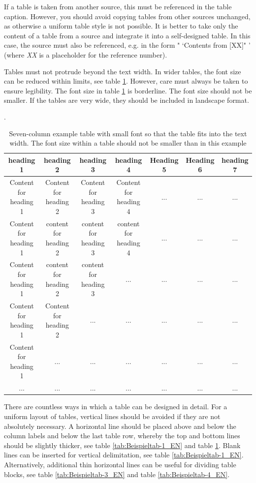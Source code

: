 If a table is taken from another source, this must be referenced in the table caption. However, you should avoid copying tables from other sources unchanged, as otherwise a uniform table style is not possible. It is better to take only the content of a table from a source and integrate it into a self-designed table. In this case, the source must also be referenced, e.g. in the form " `Contents from [XX]" ' (where \textit{XX} is a placeholder for the reference number).

Tables must not protrude beyond the text width. In wider tables, the font size can be reduced within limits, see table \ref{tab:Beispieltab-2_EN}. However, care must always be taken to ensure legibility. The font size in table \ref{tab:Beispieltab-2_EN} is borderline. The font size should not be smaller. If the tables are very wide, they should be included in landscape format.

\begin{table}[t]%
	\tiny
	\centering
	\caption[Seven-column example table with small font]{Seven-column example table with small font so that the table fits into the text width. The font size within a table should not be smaller than in this example}.
	\begin{tabular}{ccccccc}
		\toprule
		\textbf{heading 1} & \textbf{heading 2} & \textbf{heading 3} & \textbf{heading 4} & \textbf{Heading 5} & \textbf{Heading 6} & \textbf{heading 7} \\
		\midrule
		Content for heading 1 & Content for heading 2 & Content for heading 3 & Content for heading 4 & ... & ... & ... \\
		Content for heading 1 & content for heading 2 & content for heading 3 & content for heading 4 & ... & ... & ... \\
		Content for heading 1 & content for heading 2 & content for heading 3 & ... & ... & ... & ... \\
		Content for heading 1 & Content for heading 2 & ... & ... & ... & ... & ... \\
		Content for heading 1 & ... & ... & ... & ... & ... & ... \\
		... & ... & ... & ... & ... & ... & ... \\
		\bottomrule
	\end{tabular}%
	\label{tab:Beispieltab-2_EN}%
\end{table}%



There are countless ways in which a table can be designed in detail. For a uniform layout of tables, vertical lines should be avoided if they are not absolutely necessary. A horizontal line should be placed above and below the column labels and below the last table row, whereby the top and bottom lines should be slightly thicker, see table \ref{tab:Beispieltab-1_EN} and table \ref{tab:Beispieltab-2_EN}. Blank lines can be inserted for vertical delimitation, see table \ref{tab:Beispieltab-1_EN}. Alternatively, additional thin horizontal lines can be useful for dividing table blocks, see table \ref{tab:Beispieltab-3_EN} and table \ref{tab:Beispieltab-4_EN}.

